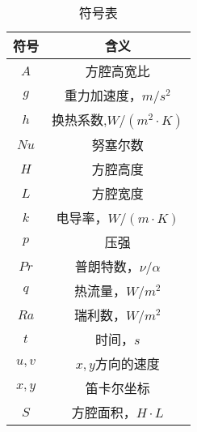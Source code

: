 \documentclass[UTF8]{article} %
\begin{document}
\begin{table}[H]
    \centering  
    \caption{符号表}
    \label{table1}
    \begin{tabular}{cc}  
  \toprule   
    符号 & 含义\\  
  \midrule  
    $A$ & 方腔高宽比  \\ 
    $g$ & 重力加速度，$m/s^2$ \\
    $h$ & 换热系数,$W/(m^2 \cdot K)$ \\
    $Nu$ & 努塞尔数  \\  
    $H$ & 方腔高度  \\    
    $L$ & 方腔宽度 \\
    $k$ & 电导率，$W/(m \cdot K)$ \\
    $p$ & 压强 \\
    $Pr$ & 普朗特数，$\nu / \alpha$ \\
    $q$ & 热流量，$W/m^2$ \\
    $Ra$ & 瑞利数，$W/m^2$ \\
    $t$ & 时间，$s$ \\
    $u,v$ & $x,y$方向的速度 \\
    $x,y$ & 笛卡尔坐标 \\
    $S$ & 方腔面积，$H \cdot L$ \\
     \bottomrule  
   \end{tabular} 
\end{table}

 
\end{document}
